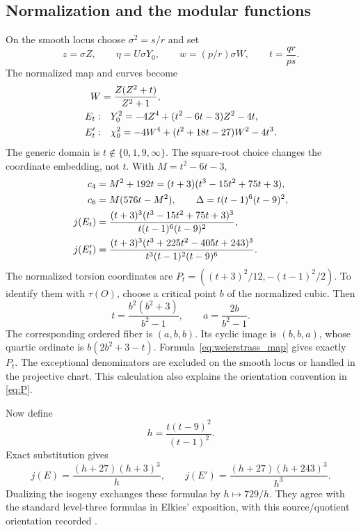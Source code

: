\subsection{Normalization and the modular functions}
On the smooth locus choose \(\sigma^2=s/r\) and set
\begin{equation}\label{eq:normalization}
 z=\sigma Z,\qquad \eta=U\sigma Y_0,\qquad
 w=(p/r)\sigma W,\qquad t=\frac{qr}{ps}.
\end{equation}
The normalized map and curves become
\begin{align}\label{eq:normalized}
 W&=\frac{Z(Z^2+t)}{Z^2+1},\notag\\
 E_t:&\quad Y_0^2=-4Z^4+(t^2-6t-3)Z^2-4t,\notag\\
 E'_t:&\quad \chi_0^2=-4W^4+(t^2+18t-27)W^2-4t^3.
\end{align}
The generic domain is \(t\notin\{0,1,9,\infty\}\). The square-root choice changes the coordinate embedding, not \(t\). With \(M=t^2-6t-3\),
\begin{align}\label{eq:normalized_invariants}
 c_4&=M^2+192t=(t+3)(t^3-15t^2+75t+3),\notag\\
 c_6&=M(576t-M^2),\qquad \Delta=t(t-1)^6(t-9)^2,\\
 j(E_t)&=\frac{(t+3)^3(t^3-15t^2+75t+3)^3}
                   {t(t-1)^6(t-9)^2},\label{eq:jt}\\
 j(E'_t)&=\frac{(t+3)^3(t^3+225t^2-405t+243)^3}
                   {t^3(t-1)^2(t-9)^6}.\label{eq:jprime}
\end{align}
The normalized torsion coordinates are \(P_t=((t+3)^2/12,-(t-1)^2/2)\). To identify them with \(\tau(O)\), choose a critical point \(b\) of the normalized cubic. Then
\begin{equation}\label{eq:torsion_link}
 t=\frac{b^2(b^2+3)}{b^2-1},\qquad a=\frac{2b}{b^2-1}.
\end{equation}
The corresponding ordered fiber is \((a,b,b)\). Its cyclic image is \((b,b,a)\), whose quartic ordinate is \(b(2b^2+3-t)\). Formula~\eqref{eq:weierstrass_map} gives exactly \(P_t\). The exceptional denominators are excluded on the smooth locus or handled in the projective chart. This calculation also explains the orientation convention in \eqref{eq:P}.

Now define
\begin{equation}\label{eq:h}
 h=\frac{t(t-9)^2}{(t-1)^2}.
\end{equation}
Exact substitution gives
\begin{equation}\label{eq:jh}
 \boxed{j(E)=\frac{(h+27)(h+3)^3}{h},\qquad
 j(E')=\frac{(h+27)(h+243)^3}{h^3}.}
\end{equation}
Dualizing the isogeny exchanges these formulas by \(h\mapsto729/h\). They agree with the standard level-three formulas in Elkies' exposition, with this source/quotient orientation recorded \cite[§4, Eq.~(80)]{elkies}.

